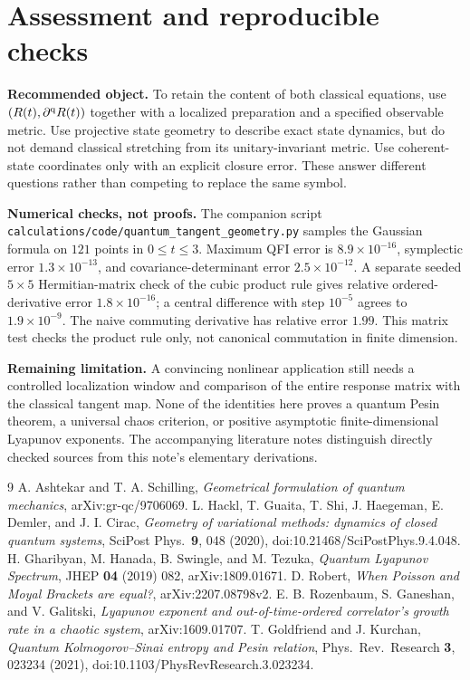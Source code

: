 \documentclass[11pt,a4paper]{article}
\begin{document}
\section{Assessment and reproducible checks}
\textbf{Recommended object.} To retain the content of both classical equations, use $(R(t),\partial^{\rm q}R(t))$ together with a localized preparation and a specified observable metric. Use projective state geometry to describe exact state dynamics, but do not demand classical stretching from its unitary-invariant metric. Use coherent-state coordinates only with an explicit closure error. These answer different questions rather than competing to replace the same symbol.

\textbf{Numerical checks, not proofs.} The companion script \texttt{calculations/code/quantum\_tangent\_geometry.py} samples the Gaussian formula on $121$ points in $0\leq t\leq3$. Maximum QFI error is $8.9\times10^{-16}$, symplectic error $1.3\times10^{-13}$, and covariance-determinant error $2.5\times10^{-12}$. A separate seeded $5\times5$ Hermitian-matrix check of the cubic product rule gives relative ordered-derivative error $1.8\times10^{-16}$; a central difference with step $10^{-5}$ agrees to $1.9\times10^{-9}$. The naive commuting derivative has relative error $1.99$. This matrix test checks the product rule only, not canonical commutation in finite dimension.

\textbf{Remaining limitation.} A convincing nonlinear application still needs a controlled localization window and comparison of the entire response matrix with the classical tangent map. None of the identities here proves a quantum Pesin theorem, a universal chaos criterion, or positive asymptotic finite-dimensional Lyapunov exponents. The accompanying literature notes distinguish directly checked sources from this note's elementary derivations.

\begin{thebibliography}{9}
 A. Ashtekar and T. A. Schilling, \emph{Geometrical formulation of quantum mechanics}, arXiv:gr-qc/9706069.
 L. Hackl, T. Guaita, T. Shi, J. Haegeman, E. Demler, and J. I. Cirac, \emph{Geometry of variational methods: dynamics of closed quantum systems}, SciPost Phys.\ \textbf{9}, 048 (2020), doi:10.21468/SciPostPhys.9.4.048.
 H. Gharibyan, M. Hanada, B. Swingle, and M. Tezuka, \emph{Quantum Lyapunov Spectrum}, JHEP \textbf{04} (2019) 082, arXiv:1809.01671.
 D. Robert, \emph{When Poisson and Moyal Brackets are equal?}, arXiv:2207.08798v2.
 E. B. Rozenbaum, S. Ganeshan, and V. Galitski, \emph{Lyapunov exponent and out-of-time-ordered correlator's growth rate in a chaotic system}, arXiv:1609.01707.
 T. Goldfriend and J. Kurchan, \emph{Quantum Kolmogorov--Sinai entropy and Pesin relation}, Phys.\ Rev.\ Research \textbf{3}, 023234 (2021), doi:10.1103/PhysRevResearch.3.023234.
\end{thebibliography}
\end{document}
